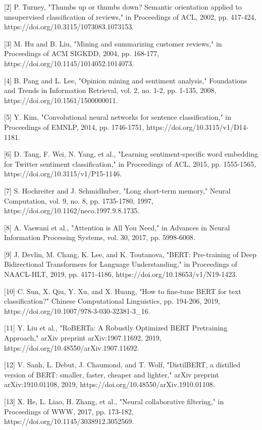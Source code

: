 \documentclass[11pt,a4paper]{article}
\begin{document}
[2] P. Turney, "Thumbs up or thumbs down? Semantic orientation applied to unsupervised classification of reviews," in Proceedings of ACL, 2002, pp. 417-424, https://doi.org/10.3115/1073083.1073153.

[3] M. Hu and B. Liu, "Mining and summarizing customer reviews," in Proceedings of ACM SIGKDD, 2004, pp. 168-177, https://doi.org/10.1145/1014052.1014073.

[4] B. Pang and L. Lee, "Opinion mining and sentiment analysis," Foundations and Trends in Information Retrieval, vol. 2, no. 1-2, pp. 1-135, 2008, https://doi.org/10.1561/1500000011.

[5] Y. Kim, "Convolutional neural networks for sentence classification," in Proceedings of EMNLP, 2014, pp. 1746-1751, https://doi.org/10.3115/v1/D14-1181.

[6] D. Tang, F. Wei, N. Yang, et al., "Learning sentiment-specific word embedding for Twitter sentiment classification," in Proceedings of ACL, 2015, pp. 1555-1565, https://doi.org/10.3115/v1/P15-1146.

[7] S. Hochreiter and J. Schmidhuber, "Long short-term memory," Neural Computation, vol. 9, no. 8, pp. 1735-1780, 1997, https://doi.org/10.1162/neco.1997.9.8.1735.

[8] A. Vaswani et al., "Attention is All You Need," in Advances in Neural Information Processing Systems, vol. 30, 2017, pp. 5998-6008.

[9] J. Devlin, M. Chang, K. Lee, and K. Toutanova, "BERT: Pre-training of Deep Bidirectional Transformers for Language Understanding," in Proceedings of NAACL-HLT, 2019, pp. 4171-4186, https://doi.org/10.18653/v1/N19-1423.

[10] C. Sun, X. Qiu, Y. Xu, and X. Huang, "How to fine-tune BERT for text classification?" Chinese Computational Linguistics, pp. 194-206, 2019, https://doi.org/10.1007/978-3-030-32381-3_16.

[11] Y. Liu et al., "RoBERTa: A Robustly Optimized BERT Pretraining Approach," arXiv preprint arXiv:1907.11692, 2019, https://doi.org/10.48550/arXiv.1907.11692.

[12] V. Sanh, L. Debut, J. Chaumond, and T. Wolf, "DistilBERT, a distilled version of BERT: smaller, faster, cheaper and lighter," arXiv preprint arXiv:1910.01108, 2019, https://doi.org/10.48550/arXiv.1910.01108.

[13] X. He, L. Liao, H. Zhang, et al., "Neural collaborative filtering," in Proceedings of WWW, 2017, pp. 173-182, https://doi.org/10.1145/3038912.3052569.
\end{document}
